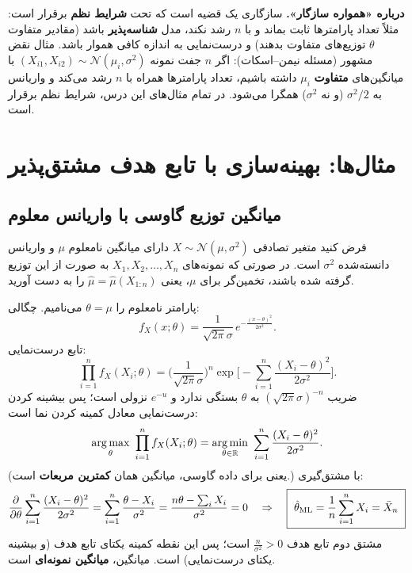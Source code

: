 \begin{note}
\notetitle \textbf{درباره «همواره سازگار».} سازگاری  یک قضیه است که تحت \textbf{شرایط نظم}  برقرار است: مثلاً تعداد پارامترها ثابت بماند و با $n$ رشد نکند، مدل \textbf{شناسه‌پذیر} باشد (مقادیر متفاوت $\theta$ توزیع‌های متفاوت بدهند) و درست‌نمایی به اندازه کافی هموار باشد. مثال نقض مشهور (مسئله نیمن--اسکات): اگر $n$ جفت نمونه $(X_{i1},X_{i2})\sim\mathcal N(\mu_i,\sigma^2)$ با میانگین‌های \textbf{متفاوت} $\mu_i$ داشته باشیم، تعداد پارامترها همراه با $n$ رشد می‌کند و  واریانس به $\sigma^2/2$ (و نه $\sigma^2$) همگرا می‌شود. در تمام مثال‌های این درس، شرایط نظم برقرار است.
\end{note}

\section{مثال‌ها: بهینه‌سازی با تابع هدف مشتق‌پذیر}

\subsection{میانگین توزیع گاوسی با واریانس معلوم}
\begin{example}
فرض کنید متغیر تصادفی $X\sim\mathcal N(\mu,\sigma^2)$ دارای میانگین نامعلوم $\mu$ و واریانس دانسته‌شده $\sigma^2$ است. در صورتی که نمونه‌های $X_1,X_2,\ldots,X_n$ به صورت  از این توزیع گرفته شده باشند، تخمین‌گر  برای $\mu$، یعنی $\hat\mu=\hat\mu(X_{1:n})$ را به دست آورید.
\begin{solution}
پارامتر نامعلوم را $\theta=\mu$ می‌نامیم. چگالی:
\[
f_X(x;\theta)=\frac{1}{\sqrt{2\pi}\sigma}\,e^{-\frac{(x-\theta)^2}{2\sigma^2}} .
\]
تابع درست‌نمایی:
\[
\prod_{i=1}^nf_X(X_i;\theta)=\Big(\frac{1}{\sqrt{2\pi}\sigma}\Big)^n\exp\Big[-\sum_{i=1}^n\frac{(X_i-\theta)^2}{2\sigma^2}\Big].
\]
ضریب $(\sqrt{2\pi}\sigma)^{-n}$ به $\theta$ بستگی ندارد و $e^{-u}$ نزولی است؛ پس بیشینه کردن درست‌نمایی معادل کمینه کردن نما است:
\[
\argmax_{\theta}\ \prod_{i=1}^nf_X(X_i;\theta)=\argmin_{\theta\in\R}\ \sum_{i=1}^n\frac{(X_i-\theta)^2}{2\sigma^2}.
\]
(یعنی برای داده گاوسی،  میانگین همان \textbf{کمترین مربعات} است.) با مشتق‌گیری:
\[
\frac{\partial}{\partial\theta}\sum_{i=1}^n\frac{(X_i-\theta)^2}{2\sigma^2}=\sum_{i=1}^n\frac{\theta-X_i}{\sigma^2}=\frac{n\theta-\sum_iX_i}{\sigma^2}=0
\quad\Rightarrow\quad
\boxed{\ \hat\theta_{\mathrm{ML}}=\frac1n\sum_{i=1}^nX_i=\bar X_n\ }
\]
مشتق دوم تابع هدف $\frac{n}{\sigma^2}>0$ است؛ پس این نقطه کمینه یکتای تابع هدف (و بیشینه یکتای درست‌نمایی) است.  میانگین، \textbf{میانگین نمونه‌ای} است.
\end{solution}
\end{example}

